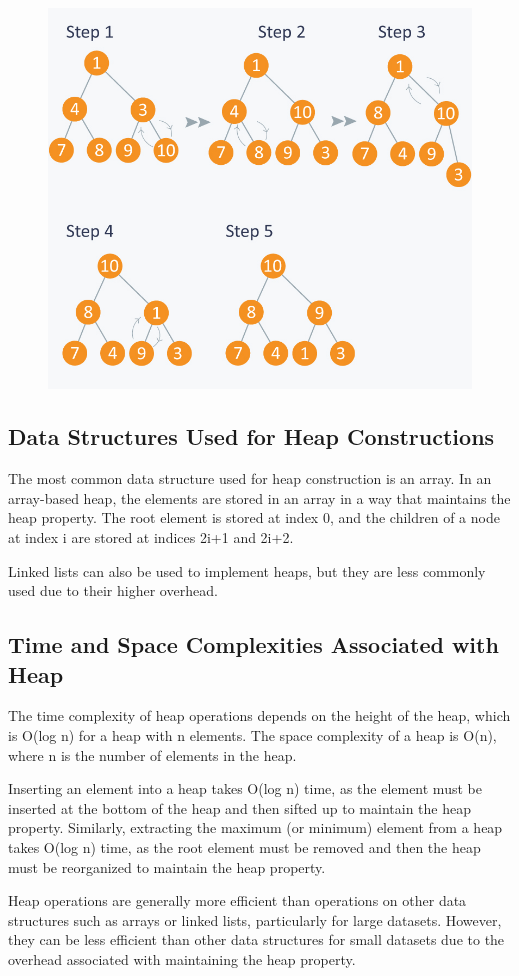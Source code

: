 \documentclass[11pt]{article}
\begin{document}
\begin{figure}[H]
    \centering
    \includegraphics[width=.45\textwidth]{af2e932.jpg}
    \caption{}
\end{figure}

\subsection{Data Structures Used for Heap Constructions}

The most common data structure used for heap construction is an array. In an array-based heap, the elements are stored in an array in a way that maintains the heap property. The root element is stored at index 0, and the children of a node at index i are stored at indices 2i+1 and 2i+2.

Linked lists can also be used to implement heaps, but they are less commonly used due to their higher overhead.

\subsection{Time and Space Complexities Associated with Heap}

The time complexity of heap operations depends on the height of the heap, which is O(log n) for a heap with n elements. The space complexity of a heap is O(n), where n is the number of elements in the heap.

Inserting an element into a heap takes O(log n) time, as the element must be inserted at the bottom of the heap and then sifted up to maintain the heap property. Similarly, extracting the maximum (or minimum) element from a heap takes O(log n) time, as the root element must be removed and then the heap must be reorganized to maintain the heap property.

Heap operations are generally more efficient than operations on other data structures such as arrays or linked lists, particularly for large datasets. However, they can be less efficient than other data structures for small datasets due to the overhead associated with maintaining the heap property.
\end{document}
